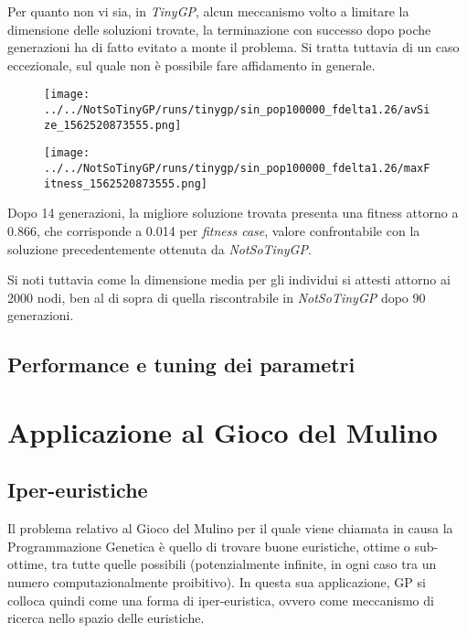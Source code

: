 \documentclass{../llncs}
\newcommand{\labelfig}[1]{\label{fig:#1}}
\begin{document}
Per quanto non vi sia, in \emph{TinyGP}, alcun meccanismo volto a limitare la dimensione delle soluzioni trovate, la terminazione con successo dopo poche generazioni ha di fatto evitato a monte il problema. Si tratta tuttavia di un caso eccezionale, sul quale non è possibile fare affidamento in generale.\\

\begin{figure}[!htb]
\centering
\texttt{[image: ../../NotSoTinyGP/runs/tinygp/sin\_pop100000\_fdelta1.26/avSize\_1562520873555.png]}
\end{figure}

\begin{figure}[!htb]
\centering
\texttt{[image: ../../NotSoTinyGP/runs/tinygp/sin\_pop100000\_fdelta1.26/maxFitness\_1562520873555.png]}
\end{figure}

Dopo 14 generazioni, la migliore soluzione trovata presenta una fitness attorno a 0.866, che corrisponde a 0.014 per \emph{fitness case}, valore confrontabile con la soluzione precedentemente ottenuta da \emph{NotSoTinyGP}.

Si noti tuttavia come la dimensione media per gli individui si attesti attorno ai 2000 nodi, ben al di sopra di quella riscontrabile in \emph{NotSoTinyGP} dopo 90 generazioni.

\subsection{Performance e tuning dei parametri}


\section{Applicazione al Gioco del Mulino}
\subsection{Iper-euristiche}
Il problema relativo al Gioco del Mulino per il quale viene chiamata in causa la Programmazione Genetica è quello di trovare buone euristiche, ottime o sub-ottime, tra tutte quelle possibili (potenzialmente infinite, in ogni caso tra un numero computazionalmente proibitivo). In questa sua applicazione, GP si colloca quindi come una forma di iper-euristica, ovvero come meccanismo di ricerca nello spazio delle euristiche.
\end{document}
